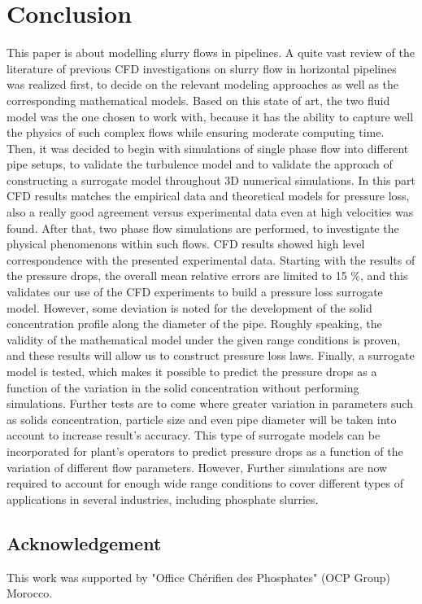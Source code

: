 \documentclass[11pt]{report}
\begin{document}
\chapter{Conclusion} 
%
This paper is about modelling slurry flows in pipelines. 
%
A quite vast review of the literature of previous CFD investigations on slurry flow in horizontal pipelines was realized first, to decide on the relevant modeling approaches as well as the corresponding mathematical models. 
%
Based on this state of art, the two fluid model was the one chosen to work with, because it has the ability to capture well the physics of such complex flows while ensuring moderate computing time. 
%
Then, it was decided to begin with simulations of single phase flow into different pipe setups, to validate the turbulence model and to validate the approach of constructing a surrogate model throughout 3D numerical simulations. 
%
In this part CFD results matches the empirical data and theoretical models for pressure loss, also a really good agreement versus experimental data even at high velocities was found. 
%
After that, two phase flow simulations are performed, to investigate the physical phenomenons within such flows.
%
 CFD results showed high level correspondence with the presented  experimental data. 
 Starting with the results of the pressure drops, the overall mean relative errors are limited to 15 $ \% $, and this validates our use of the CFD experiments to build a pressure loss surrogate model. 
 However, some deviation is noted for the development of the solid concentration profile along the diameter of the pipe. 
 Roughly speaking, the validity of the mathematical model under the given range conditions is proven, and these results will allow us to construct pressure loss laws. 
Finally, a surrogate model is tested, which makes it possible to predict the pressure drops as a function of the variation in the solid concentration without performing simulations. 
%
Further tests are to come where greater variation in parameters such as solids concentration, particle size and even pipe diameter will be taken into account to increase result's accuracy. 
%
This type of surrogate models can be incorporated for plant's operators to predict pressure drops as a function of the variation of different flow parameters.
%
However, Further simulations are now required to account for enough wide range conditions to cover different types of applications in several industries, including phosphate slurries.
%

\section*{Acknowledgement} This work was supported by "Office Chérifien des Phosphates" (OCP Group) Morocco.






\end{document}
